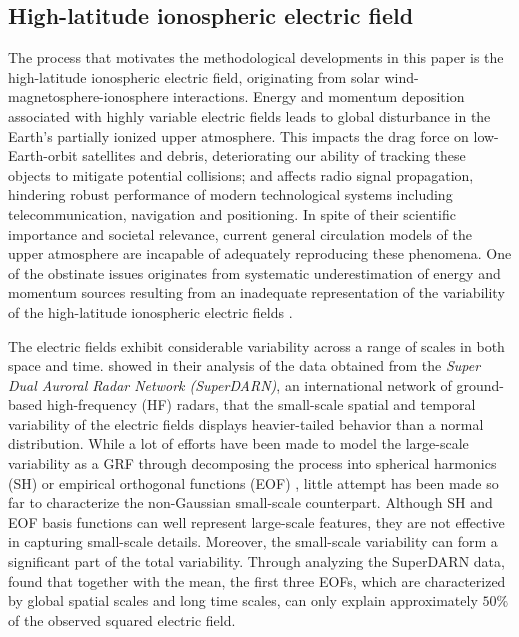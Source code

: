 \documentclass[aoas,preprint]{imsart}
\numberwithin{equation}{section}
\theoremstyle{plain}
\begin{document}
\subsection{High-latitude ionospheric electric field}
The process that motivates the methodological developments in this paper is the high-latitude ionospheric electric field, originating from solar wind-magnetosphere-ionosphere interactions. Energy and momentum deposition associated with highly variable electric fields leads to global disturbance in the Earth's partially ionized upper atmosphere. This impacts the drag force on low-Earth-orbit satellites and debris, deteriorating our ability of tracking these objects to mitigate potential collisions; and affects radio signal propagation, hindering robust performance of modern technological systems including telecommunication, navigation and positioning. In spite of their scientific importance and societal relevance, current general circulation models of the upper atmosphere are incapable of adequately reproducing these phenomena. One of the obstinate issues originates from systematic underestimation of energy and momentum sources resulting from an inadequate representation of the variability of the high-latitude ionospheric electric fields \citep{Codrescu-95, Matsuo-03}.

The electric fields exhibit considerable variability across a range of scales in both space and time. \citet{Cousins-12} showed in their analysis of the data obtained from 
the \textit{Super Dual Auroral Radar Network (SuperDARN)}, an international network of ground-based high-frequency (HF) radars, that the small-scale spatial and temporal variability of the electric fields displays heavier-tailed behavior than a normal distribution. While a lot of efforts have been made to model the large-scale variability as a GRF through decomposing the process into spherical harmonics (SH) or empirical orthogonal functions (EOF) \citep[see][and references therein] {Cousins-13-Superdarn}, little attempt has been made so far to characterize the non-Gaussian small-scale counterpart.  Although SH and EOF basis functions can well represent large-scale features, they are not effective in capturing small-scale details. 
Moreover, the small-scale variability can form a significant part of the total variability. Through analyzing the SuperDARN data, \citet{Cousins-13} found that together with the mean, the first three EOFs, which are characterized by global spatial scales and long time scales, can only explain approximately $50\%$ of the observed squared electric field. 
\end{document}
